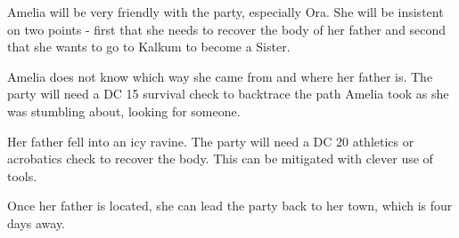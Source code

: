 Amelia will be very friendly with the party, especially Ora.
She will be insistent on two points - first that she needs to recover the body of her father and second that she wants to go to Kalkum to become a Sister.

Amelia does not know which way she came from and where her father is.
The party will need a DC 15 survival check to backtrace the path Amelia took as she was stumbling about, looking for someone.

Her father fell into an icy ravine.
The party will need a DC 20 athletics or acrobatics check to recover the body.
This can be mitigated with clever use of tools.

Once her father is located, she can lead the party back to her town, which is four days away.
